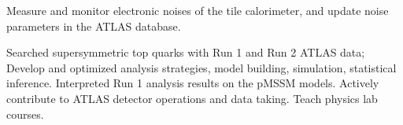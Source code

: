 \begin{cventries}
\end{cventries}
    \vspace{-1cm}
    \parbox{0.9\linewidth}{
      \leftskip=0.5in
        Measure and monitor electronic noises of the tile calorimeter, and update noise parameters in the  ATLAS database.
    }
\begin{cventries}
\end{cventries}
    \vspace{-1cm}
     \parbox{0.9\linewidth}{
      \leftskip=0.5in
        Searched supersymmetric top quarks with Run 1 and Run 2 ATLAS data; Develop and optimized analysis strategies, model building, simulation, statistical inference. \newline 
        Interpreted Run 1 analysis results on the pMSSM models. \newline
        Actively contribute to ATLAS detector operations and data taking. \newline
        Teach physics lab courses.
      }
